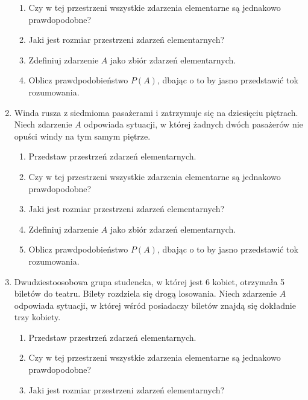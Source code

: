 \documentclass[twoside]{mwart}
\newcommand{\ans}[1]{}
\newenvironment{ansenv}{\comment}{\endcomment}
\newenvironment{ansenv}{\paragraph{Odpowiedź:}}{}
\newcommand{\ans}[1]{\begin{ansenv}#1\end{ansenv}}
\begin{document}
\begin{enumerate}
\begin{enumerate}
\item Czy w tej przestrzeni wszystkie zdarzenia elementarne są jednakowo prawdopodobne? \ans{Tak}%
\item Jaki jest rozmiar przestrzeni zdarzeń elementarnych? \ans{$\left|\Omega\right|={100\choose 50}$}%
\item Zdefiniuj zdarzenie $A$ jako zbiór zdarzeń elementarnych. \ans{$A=\{\omega_J|\left|J\cap \{1,2,\ldots,5\}\right|\leq 1\}$}%
\item Oblicz prawdpodobieństwo $P(A)$, dbając o to by jasno przedstawić tok rozumowania. \ans{$\left|A\right|={5\choose 1}{95\choose 49}+{95\choose 50}, P(A)\approx0{,}181$}%
\end{enumerate}%
\item Winda rusza z siedmioma pasażerami i zatrzymuje się na dziesięciu piętrach. Niech zdarzenie $A$ odpowiada sytuacji, w której żadnych dwóch pasażerów nie opuści windy na tym samym piętrze.
\begin{enumerate}%
\item Przedstaw przestrzeń zdarzeń elementarnych. \ans{$\Omega=\{\omega_{i_1,\ldots,i_7}|i_j=1,2,\ldots,10\}$}%
\item Czy w tej przestrzeni wszystkie zdarzenia elementarne są jednakowo prawdopodobne? \ans{Tak}%
\item Jaki jest rozmiar przestrzeni zdarzeń elementarnych? \ans{$\left|\Omega\right|=10^7$}%
\item Zdefiniuj zdarzenie $A$ jako zbiór zdarzeń elementarnych. \ans{$A=\{\omega_{i_1,\ldots,i_7}|\forall j,k\colon j\neq k\to i_j\neq i_k\}, \left|A\right|=\frac{10!}{3!}=604800$}%
\item Oblicz prawdpodobieństwo $P(A)$, dbając o to by jasno przedstawić tok rozumowania. \ans{$P(A)=\frac{604800}{10^7}=0{,}06$}%
\end{enumerate}%
\item Dwudziestoosobowa grupa studencka, w której jest 6 kobiet, otrzymała 5 biletów do teatru. Bilety rozdziela się drogą losowania. Niech zdarzenie $A$ odpowiada sytuacji, w której wśród posiadaczy biletów znajdą się dokładnie trzy kobiety.
\begin{enumerate}%
\item Przedstaw przestrzeń zdarzeń elementarnych. \ans{$\Omega=\{\omega_J|\left|J\right|=5 \land J\subset\{1,2,\ldots,20\}\}$}%
\item Czy w tej przestrzeni wszystkie zdarzenia elementarne są jednakowo prawdopodobne? \ans{Tak}%
\item Jaki jest rozmiar przestrzeni zdarzeń elementarnych? \ans{$\left|\Omega\right|={20\choose 5}=15504$}%

\end{enumerate}
\end{enumerate}
\end{document}
